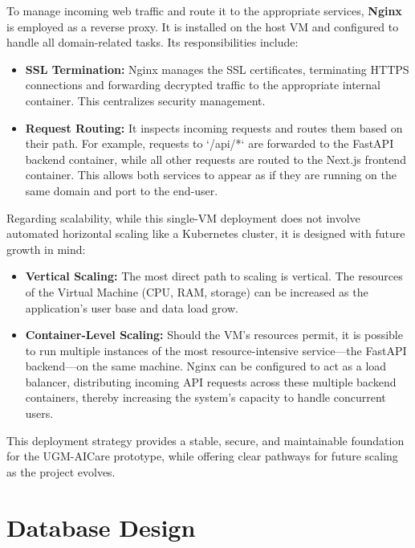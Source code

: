 To manage incoming web traffic and route it to the appropriate services, \textbf{Nginx} is employed as a reverse proxy. It is installed on the host VM and configured to handle all domain-related tasks. Its responsibilities include:
\begin{itemize}
    \item \textbf{SSL Termination:} Nginx manages the SSL certificates, terminating HTTPS connections and forwarding decrypted traffic to the appropriate internal container. This centralizes security management.
    \item \textbf{Request Routing:} It inspects incoming requests and routes them based on their path. For example, requests to `/api/*` are forwarded to the FastAPI backend container, while all other requests are routed to the Next.js frontend container. This allows both services to appear as if they are running on the same domain and port to the end-user.
\end{itemize}

Regarding scalability, while this single-VM deployment does not involve automated horizontal scaling like a Kubernetes cluster, it is designed with future growth in mind:
\begin{itemize}
    \item \textbf{Vertical Scaling:} The most direct path to scaling is vertical. The resources of the Virtual Machine (CPU, RAM, storage) can be increased as the application's user base and data load grow.
    \item \textbf{Container-Level Scaling:} Should the VM's resources permit, it is possible to run multiple instances of the most resource-intensive service—the FastAPI backend—on the same machine. Nginx can be configured to act as a load balancer, distributing incoming API requests across these multiple backend containers, thereby increasing the system's capacity to handle concurrent users.
\end{itemize}

This deployment strategy provides a stable, secure, and maintainable foundation for the UGM-AICare prototype, while offering clear pathways for future scaling as the project evolves.


\section{Database Design}
\label{sec:database_design}

